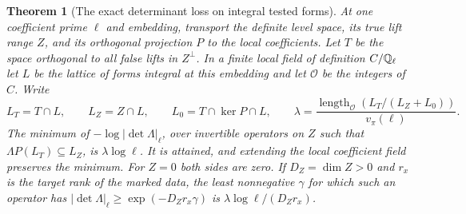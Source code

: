\documentclass[a4paper,11pt]{article}
\newtheorem{theorem}[proposition]{Theorem}
\theoremstyle{definition}
\theoremstyle{remark}
\numberwithin{equation}{section}
\begin{document}
\begin{theorem}[The exact determinant loss on integral tested forms]
\leavevmode\label{thm:projectionindex784}
At one coefficient prime \(\ell\) and embedding, transport
the definite level space, its true lift range \(Z\), and
its orthogonal projection \(P\) to the local coefficients.
Let \(T\) be the space orthogonal to all false lifts
in \(Z^\perp\). In a finite local field of definition
\(C/\mathbb Q_\ell\) let \(L\) be the lattice of forms integral
at this embedding and let \(\mathcal O\) be the integers
of \(C\). Write
\[
 L_T=T\cap L,\qquad L_Z=Z\cap L,\qquad
 L_0=T\cap\ker P\cap L,\qquad
 \lambda=\frac{\operatorname{length}_{\mathcal O}
                   (L_T/(L_Z+L_0))}{v_\pi(\ell)} .
\]
The minimum of \(-\log|\det\Lambda|_\ell\), over invertible
operators on \(Z\) such that \(\Lambda P(L_T)\subseteq L_Z\),
is \(\lambda\log\ell\). It is attained, and extending the
local coefficient field preserves the minimum. For \(Z=0\)
both sides are zero. If \(D_Z=\dim Z>0\) and \(r_x\)
is the target rank of the marked data, the least
nonnegative \(\gamma\) for which such an operator has
\(|\det\Lambda|_\ell\ge \exp(-D_Zr_x\gamma)\) is
\(\lambda\log\ell/(D_Zr_x)\).
\end{theorem}
\end{document}
